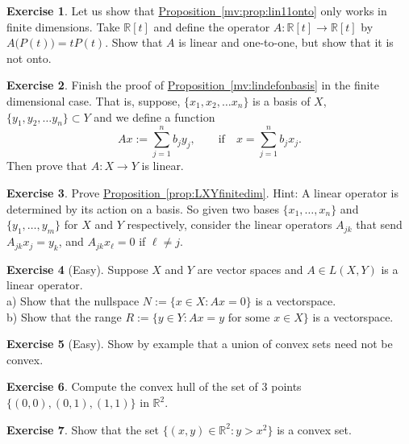 \documentclass[12pt]{book}
\newcommand{\R}{{\mathbb{R}}}
\theoremstyle{plain}
\theoremstyle{remark}
\theoremstyle{definition}
\theoremstyle{exercise}
\newtheorem{exercise}{Exercise}[section]
\theoremstyle{example}
\newcommand{\propref}[1]{\hyperref[#1]{Proposition~\ref*{#1}}}
\begin{document}
\begin{exercise}
Let us show that \propref{mv:prop:lin11onto} only works in finite
dimensions.  Take $\R[t]$ and define the operator $A \colon \R[t] \to \R[t]$
by $A\bigl(P(t)\bigr) = tP(t)$.  Show that $A$ is linear and one-to-one, but
show that it is not onto.
\end{exercise}

\begin{exercise}
Finish the proof of \propref{mv:lindefonbasis} in the finite dimensional case.
That is, suppose,
$\{ x_1, x_2,\ldots x_n \}$ is a basis of $X$,
$\{ y_1, y_2,\ldots y_n \} \subset Y$ and we define a
function
\begin{equation*}
Ax := \sum_{j=1}^n b_j y_j, \qquad \text{if} \quad x=\sum_{j=1}^n b_j x_j .
\end{equation*}
Then prove that $A \colon X \to Y$ is linear.
\end{exercise}


\begin{exercise}
Prove \propref{prop:LXYfinitedim}.  Hint: A linear operator is determined by
its action on a basis.  So given two bases
$\{ x_1,\ldots,x_n \}$ and
$\{ y_1,\ldots,y_m \}$ for $X$ and $Y$ respectively, consider the linear
operators $A_{jk}$ that send $A_{jk} x_j = y_k$, and 
$A_{jk} x_\ell = 0$ if $\ell \not= j$.
\end{exercise}

\begin{exercise}[Easy]
Suppose $X$ and $Y$ are vector spaces and $A \in L(X,Y)$ is a linear
operator.\\
a) Show that the nullspace $N := \{ x \in X : Ax = 0 \}$ is a
vectorspace.
\\
b) Show that the range $R := \{ y \in Y : Ax = y \text{ for some $x \in X$} \}$ is a
vectorspace.
\end{exercise}

\begin{exercise}[Easy]
Show by example that a union of convex sets need not be convex.
\end{exercise}

\begin{exercise}
Compute the convex hull of the set of 3 points $\{ (0,0), (0,1), (1,1) \}$ in
$\R^2$.
\end{exercise}

\begin{exercise}
Show that the set $\{ (x,y) \in \R^2 : y > x^2 \}$ is a convex set.
\end{exercise}
\end{document}
